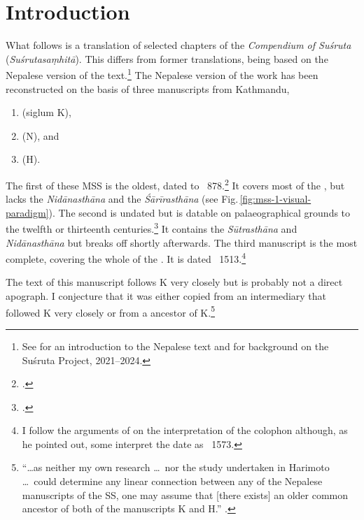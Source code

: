 
\chapter{Introduction}

What follows is a translation of selected chapters of the
\emph{Compendium of Suśruta} (\emph{Suśrutasaṃhitā}).  This differs
from former translations, being based on the Nepalese
version of the text.\footnote{See \cite{wuja-2023} for an
    introduction to the Nepalese text and \cite{wuja-2021b} for
    background on the Suśruta Project, 2021--2024.}  The Nepalese version of the 
    work has been reconstructed on the basis of three manuscripts from 
    Kathmandu, 
    \begin{enumerate}
        \item {} (siglum K),
        \item {} (N), and
        \item {} (H).
    \end{enumerate}
The first of these MSS is the oldest, dated to
\CE~878.\footcite[15]{kleb-2021b}  It covers most of the \SS, but
lacks the \emph{Nidānasthāna} and the \emph{Śārīrasthāna} (see 
Fig.\,\ref{fig:mss-1-visual-paradigm}).  The
second is undated but is datable on palaeographical grounds to the
twelfth or thirteenth centuries.\footcite[17--18]{kleb-2021b} It
contains the \emph{Sūtrasthāna} and \emph{Nidānasthāna} but breaks
off shortly afterwards.  The third manuscript is the most complete,
covering the whole of the \SS. It is dated \CE~1513.\footnote{I
    follow the arguments of \citet[21--26]{kleb-2021b} on the
    interpretation of the colophon although, as he pointed out, some
    interpret the date as \CE\ 1573.}  
    
The text of this manuscript follows K very closely but is probably
not a direct apograph.  I conjecture that it was either copied from
an intermediary that followed K very closely or from a ancestor of
K.\footnote{“\ldots as neither my own research \ldots\ nor the study
    undertaken in Harimoto \ldots\ could determine any linear connection
    between any of the Nepalese manuscripts of the SS, one may assume
    that [there exists] an older common ancestor of both of the
    manuscripts K and H.” \citep[21]{kleb-2021a}.}
        
